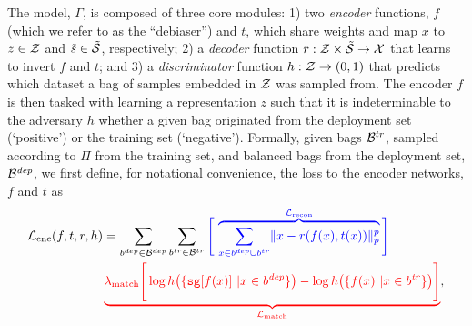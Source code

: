 The model, $\Gamma$, is composed of three core modules: 
1) two \emph{encoder} functions, $f$ (which we refer to
as the ``debiaser'') and $t$, which share weights and map $x$ to $z \in {\mathcal{Z}}$ and
$\tilde{s} \in \tilde{{\mathcal{S}}}$, respectively;
2) a \emph{decoder} function \(r: {\mathcal{Z}} \times \tilde{{\mathcal{S}}} \to {\mathcal{X}}\) that learns to
invert $f$ and $t$; and
3) a \emph{discriminator} function $h: {\mathcal{Z}} \to ( 0, 1 )$ that predicts which
dataset a bag of samples embedded in ${\mathcal{Z}}$ was sampled from. 
%
The encoder $f$ is then tasked with learning a representation $z$ such that it is indeterminable to
the adversary $h$ whether a given bag originated from the deployment set (`positive') or the
training set (`negative').
Formally, given bags
\( {\mathcal{B}}^{tr} \), sampled according to \(\Pi\) from the training set, and balanced bags from the deployment
set, \( {\mathcal{B}}^\mathit{dep} \), we first define, for notational convenience, the loss \wrt{} to the
encoder networks, $f$ and $t$ as
%
\begin{align}
&{\mathcal{L}}_\text{enc}(f, t, r, h) = 
  \sum_{b^{dep} \in {\mathcal{B}}^{dep}}
  \sum_{b^{tr} \in {\mathcal{B}}^{tr}} 
\textcolor{blue}{
  \Bigg[\,
    \overbrace{
    \sum_{x \in b^{dep} \cup b^{tr}} 
      \lVert x - r(f(x), t(x))\rVert_p^p}^{{\mathcal{L}}_{\text{recon}}}
    \Bigg]
    }
    \nonumber\\
   &\quad\quad\quad\quad\quad\quad
   \textcolor{red}{
     \underbrace{ \lambda_\text{match}  \Bigg[
       \log h \bigl( \{ \texttt{sg}[f(x)]\ | x \in b^\mathit{dep} \} \bigr) 
       - \log h \bigl( \{ f(x)\ | x \in b^\mathit{tr} \} \bigr) 
 \Bigg] }_{{\mathcal{L}}_{\text{match}}}
},
\label{eq:disentangling}
\end{align}
